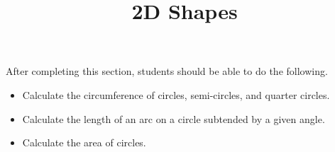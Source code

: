 \documentclass{ximera}
\title{2D Shapes}
\begin{document}
\begin{abstract} 
\end{abstract}

\maketitle

\begin{sectionOutcomes}
After completing this section, students should be able to do the following.

\begin{itemize}
	\item Calculate the circumference of circles, semi-circles, and quarter circles. 
    \item Calculate the length of an arc on a circle subtended by a given angle. 
    \item Calculate the area of circles.

\end{itemize}
\end{sectionOutcomes}
\end{document}
